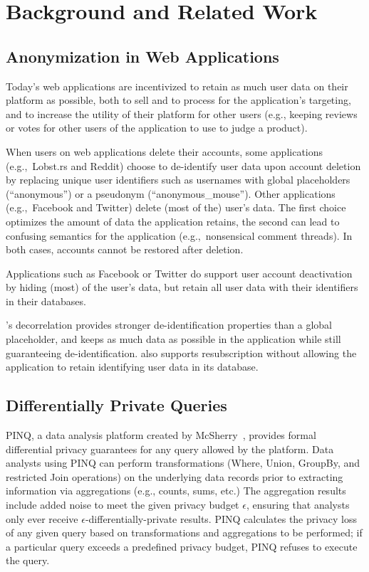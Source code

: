 \section{Background and Related Work}

\subsection{Anonymization in Web Applications}
Today's web applications are incentivized to retain as much user data on their platform as possible,
both to sell and to process for the application's targeting, and to increase the utility of their
platform for other users (e.g., keeping reviews or votes for other users of the application to use
to judge a product).

When users on web applications delete their accounts, some applications (e.g.,\ Lobst.rs and Reddit)
choose to de-identify user data upon account deletion by replacing unique user identifiers such as
usernames with global placeholders (``anonymous'') or a pseudonym (``anonymous\_mouse''). Other
applications (e.g.,\ Facebook and Twitter) delete (most of the) user's data.  The first choice
optimizes the amount of data the application retains, the second can lead to confusing semantics for
the application (e.g.,\ nonsensical comment threads). In both cases, accounts cannot be restored
after deletion. 

Applications such as Facebook or Twitter do support user account deactivation by hiding (most) of the
user's data, but retain all user data with their identifiers in their databases.

\sys{}'s decorrelation provides stronger de-identification properties than a global placeholder, and
keeps as much data as possible in the application while still guaranteeing de-identification.
\sys{} also supports resubscription without allowing the application to retain identifying user data
in its database.

\subsection{Differentially Private Queries}

PINQ, a data analysis platform created by McSherry~\cite{pinq}, provides formal differential privacy
guarantees for any query allowed by the platform.  Data analysts using PINQ can perform
transformations (Where, Union, GroupBy, and restricted Join operations) on the underlying data
records prior to extracting information via aggregations (e.g., counts, sums, etc.) The aggregation
results include added noise to meet the given privacy budget $\epsilon$, ensuring that analysts only
ever receive $\epsilon$-differentially-private results.  PINQ calculates the privacy loss of any
given query based on transformations and aggregations to be performed; if a particular query exceeds
a predefined privacy budget, PINQ refuses to execute the query.


